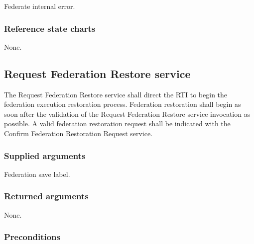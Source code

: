 \begin{stdalphalist}
    \item Federate internal error.
\end{stdalphalist}

\subsubsection{Reference state charts}

\begin{stdalphalist}
    \item None.
\end{stdalphalist}

\subsection{Request Federation Restore service}

The Request Federation Restore service shall direct the RTI to begin the federation execution restoration process. Federation restoration shall begin as soon after the validation of the Request Federation Restore service invocation as possible. A valid federation restoration request shall be indicated with the Confirm Federation Restoration Request \rtiinitiated{} service.

\subsubsection{Supplied arguments}

\begin{stdalphalist}
    \item Federation save label.
\end{stdalphalist}

\subsubsection{Returned arguments}

\begin{stdalphalist}
    \item None.
\end{stdalphalist}

\subsubsection{Preconditions}

